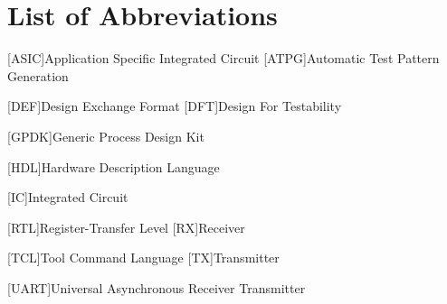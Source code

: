 \section*{List of Abbreviations}
\begin{acronym}
	[ASIC]{Application Specific Integrated Circuit}
	[ATPG]{Automatic Test Pattern Generation}
	
	[DEF]{Design Exchange Format}
	[DFT]{Design For Testability}
		
	[GPDK]{Generic Process Design Kit}
		
	[HDL]{Hardware Description Language}
	
	[IC]{Integrated Circuit}
		
	[RTL]{Register-Transfer Level}
	[RX]{Receiver}
		
	[TCL]{Tool Command Language}
	[TX]{Transmitter}
	
	[UART]{Universal Asynchronous Receiver Transmitter}
	
\end{acronym}


